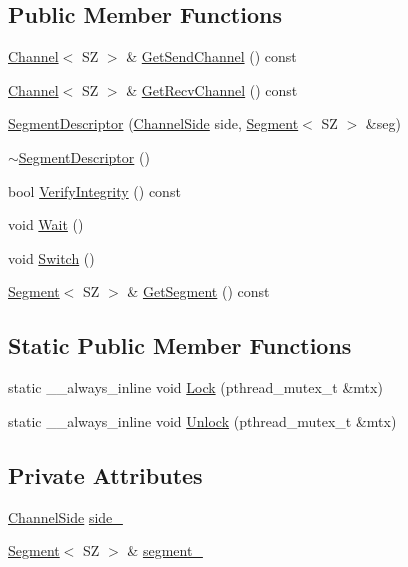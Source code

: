 \subsection*{Public Member Functions}
\begin{DoxyCompactItemize}
\item 
\hyperlink{classChannel}{Channel}$<$ SZ $>$ \& \hyperlink{classSegmentDescriptor_a2f9e15ad56caf25a73a76ebb9dcfd26e}{Get\+Send\+Channel} () const
\item 
\hyperlink{classChannel}{Channel}$<$ SZ $>$ \& \hyperlink{classSegmentDescriptor_a3b7cb0548fb39870191fce0d42b20494}{Get\+Recv\+Channel} () const
\item 
\hyperlink{classSegmentDescriptor_a042a4c43ff3213dc643a3b8fb40c9b05}{Segment\+Descriptor} (\hyperlink{proxy_8hpp_a249fda9ad200a554304ecf8de90d6877}{Channel\+Side} side, \hyperlink{classSegment}{Segment}$<$ SZ $>$ \&seg)
\item 
\hyperlink{classSegmentDescriptor_a1b8897effdc10f093db07328aa9eb64f}{$\sim$\+Segment\+Descriptor} ()
\item 
bool \hyperlink{classSegmentDescriptor_a2dd29d04ba59a348aa2188f86a5c3cff}{Verify\+Integrity} () const
\item 
void \hyperlink{classSegmentDescriptor_a253f68680c02ea71b6504f5ce9dba741}{Wait} ()
\item 
void \hyperlink{classSegmentDescriptor_aca5320d3edfabec89285c251b8c25094}{Switch} ()
\item 
\hyperlink{classSegment}{Segment}$<$ SZ $>$ \& \hyperlink{classSegmentDescriptor_a11f3ac05bd4f223fac0c67e54b44cd7f}{Get\+Segment} () const
\end{DoxyCompactItemize}
\subsection*{Static Public Member Functions}
\begin{DoxyCompactItemize}
\item 
static \+\_\+\+\_\+always\+\_\+inline void \hyperlink{classSegmentDescriptor_ab5cc70efd5c89b3466174bb48e951ede}{Lock} (pthread\+\_\+mutex\+\_\+t \&mtx)
\item 
static \+\_\+\+\_\+always\+\_\+inline void \hyperlink{classSegmentDescriptor_aed5e493d85b1132056e180861799557d}{Unlock} (pthread\+\_\+mutex\+\_\+t \&mtx)
\end{DoxyCompactItemize}
\subsection*{Private Attributes}
\begin{DoxyCompactItemize}
\item 
\hyperlink{proxy_8hpp_a249fda9ad200a554304ecf8de90d6877}{Channel\+Side} \hyperlink{classSegmentDescriptor_a0e3fbc1517507dd8ce948232cfd5508b}{side\+\_\+}
\item 
\hyperlink{classSegment}{Segment}$<$ SZ $>$ \& \hyperlink{classSegmentDescriptor_ad0c2fdf75d6c44f0b01e3e8f7a7a5977}{segment\+\_\+}
\end{DoxyCompactItemize}


